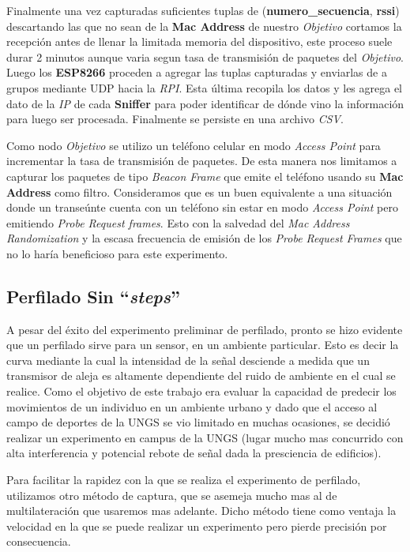 Finalmente una vez capturadas suficientes tuplas de (\textbf{numero\_secuencia}, \textbf{rssi}) descartando las que no sean de la \textbf{Mac Address} de nuestro \textit{Objetivo} cortamos la recepción antes de llenar la limitada memoria del dispositivo, este proceso suele durar 2 minutos aunque varia segun tasa de transmisión de paquetes del \textit{Objetivo}. Luego los \textbf{ESP8266} proceden a agregar las tuplas capturadas y enviarlas de a grupos mediante UDP hacia la \textit{RPI}. Esta última recopila los datos y les agrega el dato de la \textit{IP} de cada \textbf{Sniffer} para poder identificar de dónde vino la información para luego ser procesada. Finalmente se persiste en una archivo \textit{CSV}.

Como nodo \textit{Objetivo} se utilizo un teléfono celular en modo \textit{Access Point} para incrementar la tasa de transmisión de paquetes. De esta manera nos limitamos a capturar los paquetes de tipo \textit{Beacon Frame} que emite el teléfono usando su \textbf{Mac Address} como filtro. Consideramos que es un buen equivalente a una situación donde un transeúnte cuenta con un teléfono sin estar en modo \textit{Access Point} pero emitiendo \textit{Probe Request frames}. Esto con la salvedad del \textit{Mac Address Randomization} y la escasa frecuencia de emisión de los \textit{Probe Request Frames} que no lo haría beneficioso para este experimento.


\subsection{Perfilado Sin \textbf{“\textit{steps}”} }
A pesar del éxito del experimento preliminar de perfilado, pronto se hizo evidente que un perfilado sirve para un sensor, en un ambiente particular. Esto es decir la curva mediante la cual la intensidad de la señal desciende a medida que un transmisor de aleja es altamente dependiente del ruido de ambiente en el cual se realice.
Como el objetivo de este trabajo era evaluar la capacidad de predecir los movimientos de un individuo en un ambiente urbano y dado que el acceso al campo de deportes de la UNGS se vio limitado en muchas ocasiones, se decidió realizar un experimento en campus de la UNGS (lugar mucho mas concurrido con alta interferencia y potencial rebote de señal dada la presciencia de edificios).

Para facilitar la rapidez con la que se realiza el experimento de perfilado, utilizamos otro método de captura, que se asemeja mucho mas al de multilateración que usaremos mas adelante. Dicho método tiene como ventaja la velocidad en la que se puede realizar un experimento pero pierde precisión por consecuencia.

